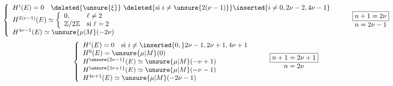 \[
\left\{\begin{array}{l}
H^i(E)=0\quad
\deleted{\unsure{\xi}}\ \deleted{\text{si }i\ne\unsure{2(\nu-1)}}
\inserted{i\ne0,2\nu-2,4\nu-1}\\
H^{2(\nu-1)}(E)\simeq
\left\{\begin{array}{ll}0,&\ell\ne2\\
\mathbb Z/2\mathbb Z&\text{si }\ell=2
\end{array}\right.\\
H^{4\nu-1}(E)\simeq\unsure{\mu|M}(-2\nu)
\end{array}\right.
\qquad
\begin{array}{c}\boxed{n+1=2\nu}\\n=2\nu-1\end{array}
\]
\[
\left\{\begin{array}{l}
H^i(E)=0\quad\text{si }i\ne\inserted{0,}2\nu-1,2\nu+1,4\nu+1\\
H^0(E)=\unsure{\mu|M}(0)\\
H^{\unsure{2\nu-1}}(E)\simeq\unsure{\mu|M}(-\nu+1)\\
H^{\unsure{2\nu+1}}(E)\simeq\unsure{\mu|M}(-\nu-1)\\
H^{4\nu+1}(E)\simeq\unsure{\mu|M}(-2\nu-1)
\end{array}\right.
\qquad
\begin{array}{c}\boxed{n+1=2\nu+1}\\n=2\nu\end{array}
\]
